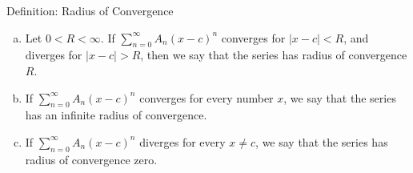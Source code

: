 \begin{frame}[t]
\begin{block}{Definition: Radius of Convergence}
\begin{enumerate}[(a)]
\item
Let $0<R<\infty$. If $\sum\limits_{n=0}^\infty A_n(x-c)^n$
converges for $|x-c|<R$,  and diverges for $|x-c| > R$,
then we say that the series has radius of convergence $R$.

\begin{center}
\end{center}
\item
If $\sum_{n=0}^\infty A_n(x-c)^n$ converges for every number $x$,
we say that the series has an infinite radius of convergence.
\begin{center}
\end{center}
\item
If $\sum_{n=0}^\infty A_n(x-c)^n$ diverges for every $x\ne c$,
we say that the series has radius of convergence zero.
\begin{center}
\end{center}
\end{enumerate}
\end{block}
\end{frame}
